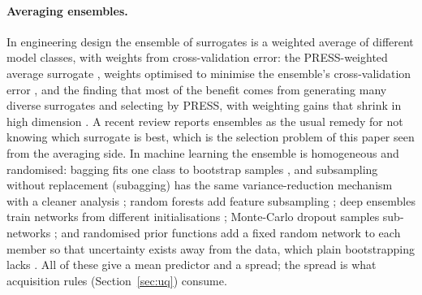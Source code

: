 \paragraph{Averaging ensembles.}
In engineering design the ensemble of surrogates is a weighted average of different model classes, with weights
from cross-validation error: the PRESS-weighted average surrogate \cite{goel2007ensemble}, weights optimised to
minimise the ensemble's cross-validation error \cite{acar2009ensemble}, and the finding that most of the benefit comes
from generating many diverse surrogates and selecting by PRESS, with weighting gains that shrink in high dimension
\cite{viana2009multiple}. A recent review \cite{chen2024ensemble} reports ensembles as the usual remedy for not knowing
which surrogate is best, which is the selection problem of this paper seen from the averaging side. In machine
learning the ensemble is homogeneous and randomised: bagging fits one class to bootstrap samples
\cite{breiman1996bagging}, and subsampling without replacement (subagging) has the same variance-reduction mechanism
with a cleaner analysis \cite{buhlmann2002analyzing}; random forests add feature subsampling \cite{breiman2001random};
deep ensembles train networks from different initialisations \cite{lakshminarayanan2017simple}; Monte-Carlo dropout
samples sub-networks \cite{gal2016dropout}; and randomised prior functions add a fixed random network to each member
so that uncertainty exists away from the data, which plain bootstrapping lacks \cite{osband2018randomized}. All of
these give a mean predictor and a spread; the spread is what acquisition rules (Section~\ref{sec:uq}) consume.

